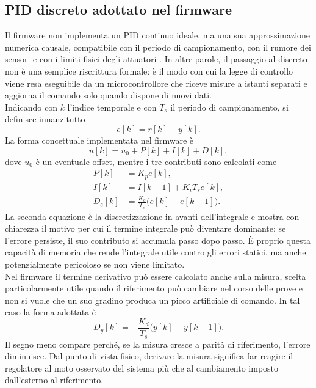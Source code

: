 \documentclass[11pt]{report}
\begin{document}
	\subsection{PID discreto adottato nel firmware}
	Il firmware non implementa un PID continuo ideale, ma una sua approssimazione numerica causale, compatibile con il periodo di campionamento, con il rumore dei sensori e con i limiti fisici degli attuatori \cite{Astrom2002ControlSystemDesign}. In altre parole, il passaggio al discreto non è una semplice riscrittura formale: è il modo con cui la legge di controllo viene resa eseguibile da un microcontrollore che riceve misure a istanti separati e aggiorna il comando solo quando dispone di nuovi dati.\\
	Indicando con $k$ l'indice temporale e con $T_s$ il periodo di campionamento, si definisce innanzitutto
	\begin{equation}
		e[k]=r[k]-y[k].
	\end{equation}
	La forma concettuale implementata nel firmware è
	\begin{equation}
		u[k]=u_0 + P[k] + I[k] + D[k],
	\end{equation}
	dove $u_0$ è un eventuale offset, mentre i tre contributi sono calcolati come
	\begin{align}
		P[k] &= K_p e[k], \\
		I[k] &= I[k-1] + K_i T_s e[k], \\
		D_e[k] &= \frac{K_d}{T_s}\bigl(e[k]-e[k-1]\bigr).
	\end{align}
	La seconda equazione è la discretizzazione in avanti dell'integrale e mostra con chiarezza il motivo per cui il termine integrale può diventare dominante: se l'errore persiste, il suo contributo si accumula passo dopo passo. È proprio questa capacità di memoria che rende l'integrale utile contro gli errori statici, ma anche potenzialmente pericoloso se non viene limitato.\\
	Nel firmware il termine derivativo può essere calcolato anche sulla misura, scelta particolarmente utile quando il riferimento può cambiare nel corso delle prove e non si vuole che un suo gradino produca un picco artificiale di comando. In tal caso la forma adottata è
	\begin{equation}
		D_y[k]= -\frac{K_d}{T_s}\bigl(y[k]-y[k-1]\bigr).
	\end{equation}
	Il segno meno compare perché, se la misura cresce a parità di riferimento, l'errore diminuisce. Dal punto di vista fisico, derivare la misura significa far reagire il regolatore al moto osservato del sistema più che al cambiamento imposto dall'esterno al riferimento.\\
\end{document}
